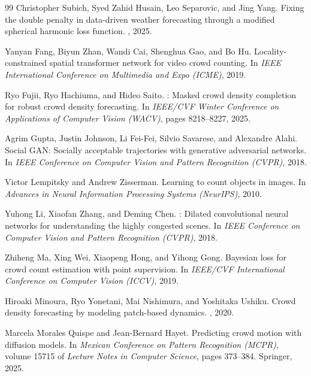 \documentclass{article}
\begin{document}
{\begin{thebibliography}{99}
Christopher Subich, Syed Zahid Husain, Leo Separovic, and Jing Yang.
\newblock Fixing the double penalty in data-driven weather forecasting through a
  modified spherical harmonic loss function.
, 2025.

Yanyan Fang, Biyun Zhan, Wandi Cai, Shenghua Gao, and Bo Hu.
\newblock Locality-constrained spatial transformer network for video crowd
  counting.
\newblock In {\em IEEE International Conference on Multimedia and Expo (ICME)},
  2019.

Ryo Fujii, Ryo Hachiuma, and Hideo Saito.
: Masked crowd density completion for robust crowd density
  forecasting.
\newblock In {\em IEEE/CVF Winter Conference on Applications of Computer Vision
  (WACV)}, pages 8218--8227, 2025.

Agrim Gupta, Justin Johnson, Li Fei-Fei, Silvio Savarese, and
  Alexandre Alahi.
\newblock Social {GAN}: Socially acceptable trajectories with generative
  adversarial networks.
\newblock In {\em IEEE Conference on Computer Vision and Pattern Recognition
  (CVPR)}, 2018.

Victor Lempitsky and Andrew Zisserman.
\newblock Learning to count objects in images.
\newblock In {\em Advances in Neural Information Processing Systems (NeurIPS)},
  2010.

Yuhong Li, Xiaofan Zhang, and Deming Chen.
: Dilated convolutional neural networks for understanding the
  highly congested scenes.
\newblock In {\em IEEE Conference on Computer Vision and Pattern Recognition
  (CVPR)}, 2018.

Zhiheng Ma, Xing Wei, Xiaopeng Hong, and Yihong Gong.
\newblock Bayesian loss for crowd count estimation with point supervision.
\newblock In {\em IEEE/CVF International Conference on Computer Vision (ICCV)},
  2019.

Hiroaki Minoura, Ryo Yonetani, Mai Nishimura, and Yoshitaka Ushiku.
\newblock Crowd density forecasting by modeling patch-based dynamics.
, 2020.

Marcela Morales Quispe and Jean-Bernard Hayet.
\newblock Predicting crowd motion with diffusion models.
\newblock In {\em Mexican Conference on Pattern Recognition (MCPR)}, volume
  15715 of {\em Lecture Notes in Computer Science}, pages 373--384. Springer,
  2025.


\end{thebibliography}}
\end{document}
